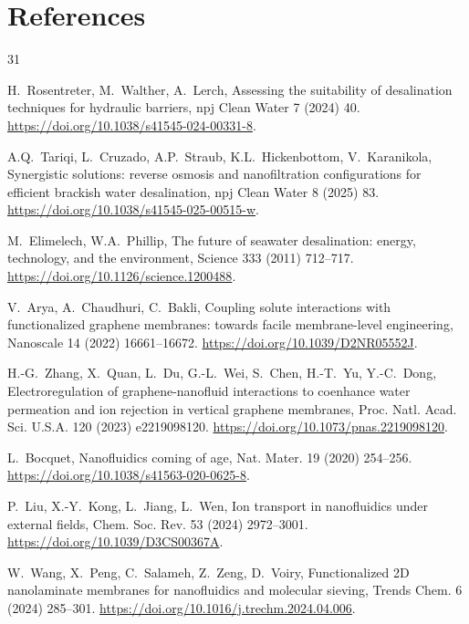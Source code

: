 \documentclass[3p,preprint,12pt,numbers,square,sort&compress]{elsarticle}
\begin{document}
\section*{References}
\begin{thebibliography}{31}

H.~Rosentreter, M.~Walther, A.~Lerch, Assessing the suitability of desalination techniques for hydraulic barriers, npj Clean Water 7 (2024) 40. \href{https://doi.org/10.1038/s41545-024-00331-8}{https://doi.org/10.1038/s41545-024-00331-8}.

A.Q.~Tariqi, L.~Cruzado, A.P.~Straub, K.L.~Hickenbottom, V.~Karanikola, Synergistic solutions: reverse osmosis and nanofiltration configurations for efficient brackish water desalination, npj Clean Water 8 (2025) 83. \href{https://doi.org/10.1038/s41545-025-00515-w}{https://doi.org/10.1038/s41545-025-00515-w}.

M.~Elimelech, W.A.~Phillip, The future of seawater desalination: energy, technology, and the environment, Science 333 (2011) 712--717. \href{https://doi.org/10.1126/science.1200488}{https://doi.org/10.1126/science.1200488}.

V.~Arya, A.~Chaudhuri, C.~Bakli, Coupling solute interactions with functionalized graphene membranes: towards facile membrane-level engineering, Nanoscale 14 (2022) 16661--16672. \href{https://doi.org/10.1039/D2NR05552J}{https://doi.org/10.1039/D2NR05552J}.

H.-G.~Zhang, X.~Quan, L.~Du, G.-L.~Wei, S.~Chen, H.-T.~Yu, Y.-C.~Dong, Electroregulation of graphene-nanofluid interactions to coenhance water permeation and ion rejection in vertical graphene membranes, Proc. Natl. Acad. Sci. U.S.A. 120 (2023) e2219098120. \href{https://doi.org/10.1073/pnas.2219098120}{https://doi.org/10.1073/pnas.2219098120}.

L.~Bocquet, Nanofluidics coming of age, Nat. Mater. 19 (2020) 254--256. \href{https://doi.org/10.1038/s41563-020-0625-8}{https://doi.org/10.1038/s41563-020-0625-8}.

P.~Liu, X.-Y.~Kong, L.~Jiang, L.~Wen, Ion transport in nanofluidics under external fields, Chem. Soc. Rev. 53 (2024) 2972--3001. \href{https://doi.org/10.1039/D3CS00367A}{https://doi.org/10.1039/D3CS00367A}.

W.~Wang, X.~Peng, C.~Salameh, Z.~Zeng, D.~Voiry, Functionalized 2D nanolaminate membranes for nanofluidics and molecular sieving, Trends Chem. 6 (2024) 285--301. \href{https://doi.org/10.1016/j.trechm.2024.04.006}{https://doi.org/10.1016/j.trechm.2024.04.006}.


\end{thebibliography}
\end{document}
